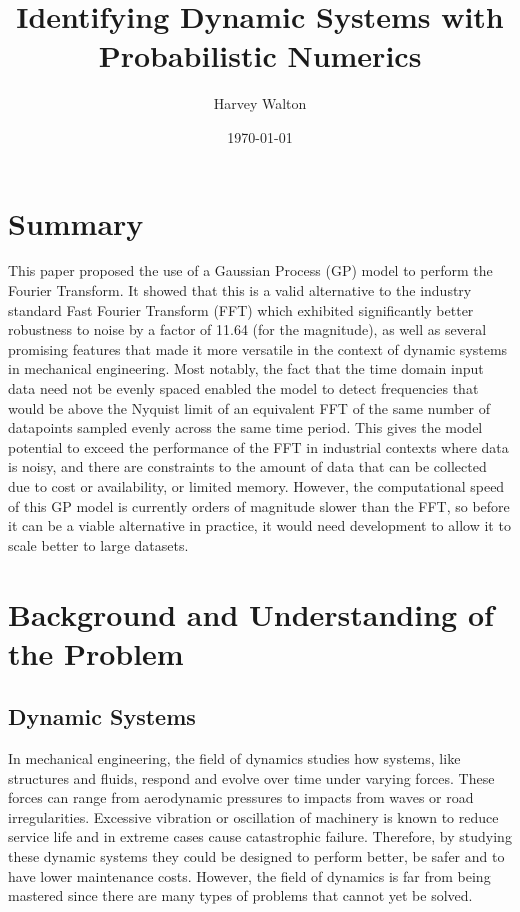 \documentclass[12pt]{article}
\title{Identifying Dynamic Systems with Probabilistic Numerics}
\author{Harvey Walton}
\date{\today}
\begin{document}

    \thispagestyle{empty}
    

    \section{Summary}
    This paper proposed the use of a Gaussian Process (GP) model to perform the Fourier Transform.
    It showed that this is a valid alternative to the industry standard Fast Fourier Transform (FFT) which exhibited significantly better robustness to noise by a factor of 11.64 (for the magnitude), as well as several promising features that made it more versatile in the context of dynamic systems in mechanical engineering.
    Most notably, the fact that the time domain input data need not be evenly spaced enabled the model to detect frequencies that would be above the Nyquist limit of an equivalent FFT of the same number of datapoints sampled evenly across the same time period.
    This gives the model potential to exceed the performance of the FFT in industrial contexts where data is noisy, and there are constraints to the amount of data that can be collected due to cost or availability, or limited memory.
    However, the computational speed of this GP model is currently orders of magnitude slower than the FFT, so before it can be a viable alternative in practice, it would need development to allow it to scale better to large datasets.

    \printnomenclature

    \newpage
    \tableofcontents
    \newpage


    \section{Background and Understanding of the Problem}

    \subsection{Dynamic Systems}
    In mechanical engineering, the field of dynamics studies how systems, like structures and fluids, respond and evolve over time under varying forces.
    These forces can range from aerodynamic pressures to impacts from waves or road irregularities.
    Excessive vibration or oscillation of machinery is known to reduce service life and in extreme cases cause catastrophic failure.
    Therefore, by studying these dynamic systems they could be designed to perform better, be safer and to have lower maintenance costs.
    However, the field of dynamics is far from being mastered since there are many types of problems that cannot yet be solved.
\end{document}

